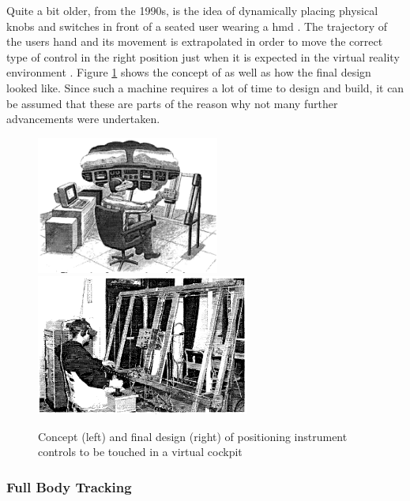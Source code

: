 Quite a bit older, from the 1990s, is the idea of dynamically placing physical knobs and switches in front of a seated user wearing a \gls{hmd} \citep{Latham1997}. The trajectory of the users hand and its movement is extrapolated in order to move the correct type of control in the right position just when it is expected in the virtual reality environment \citep{Latham1997}. Figure \ref{fig:touchcockpit} shows the concept of \cite{Latham1997} as well as how the final design looked like. Since such a machine requires a lot of time to design and build, it can be assumed that these are parts of the reason why not many further advancements were undertaken.
\begin{figure}[h]
	\begin{center}
		\includegraphics[width=6cm]{03_Figures/05_LitReview/Latham1997_Concept.png}
		\includegraphics[width=7cm]{03_Figures/05_LitReview/Latham1997_FinalDesign.png}
		\caption[Concept and final design of positioning instrument controls to be touched in a virtual cockpit]{Concept (left) and final design (right) of positioning instrument controls to be touched in a virtual cockpit \citep{Latham1997}}
		\label{fig:touchcockpit}
	\end{center}
\end{figure}


\subsubsection{Full Body Tracking}


